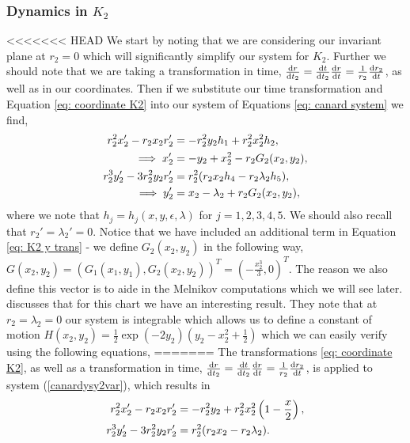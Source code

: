 \subsubsection{Dynamics in \texorpdfstring{$K_2$}{K2}}
<<<<<<< HEAD
We start by noting that we are considering our invariant plane at $r_2=0$ which will significantly simplify our system for $K_2$. Further we should note that we are taking a transformation in time, $\od{r}{t_2}=\od{t}{t_2}\od{r}{t}=\frac{1}{r_2}\od{r_2}{t}$, as well as in our coordinates. Then if we substitute our time transformation and Equation  \ref{eq: coordinate K2} into our system of Equations \ref{eq: canard system} we find, 
\begin{subequations}
	\begin{align}
	r_2^2x_2' - r_2x_2r_2'&=-r_2^2y_2h_1+r^2_2x^2_2h_2,\notag\\
	\implies x'_2&=-y_2+x_2^2-r_2G_2(x_2,y_2),\\
	r^3_2y_2'-3r_2^2y_2r_2'&=r^2_2(r_2x_2h_4-r_2\lambda_2h_5),\notag\\
	\implies y_2'&=x_2-\lambda_2+r_2G_2(x_2,y_2), \label{eq: K2 y trans}
	\end{align}
	\label{eq: reduced canard k2}
\end{subequations}
where we note that $h_j=h_j(x,y,\epsilon,\lambda)$ for $j=1,2,3,4,5$. We should also recall that $r_2'=\lambda_2'=0$. Notice that we have included an additional term in Equation \ref{eq: K2 y trans} - we define $G_2(x_2,y_2)$ in the following way, $G(x_2,y_2)=(G_1(x_1,y_1),G_2(x_2,y_2))^T=(-\frac{x^3_2}{3},0)^T$. The reason we also define this vector is to aide in the Melnikov computations which we will see later. \citet{krupa2001} discusses that for this chart we have an interesting result. They note that at $r_2=\lambda_2=0$ our system is integrable which allows us to define a constant of motion $H(x_2,y_2)=\frac{1}{2}\exp{(-2y_2)}\left(y_2-x^2_2+\frac{1}{2}\right)$ which we can easily verify \citep{krupa2001} using the following equations,
=======
The transformations \ref{eq: coordinate K2}, as well as a transformation in time, $\od{r}{t_2}=\od{t}{t_2}\od{r}{t}=\frac{1}{r_2}\od{r_2}{t}$, is applied to system (\ref{canardysy2var}), which results in 
\begin{align*}
	r_2^2x_2' - r_2x_2r_2'&=-r_2^2y_2+r^2_2x^2_2\left( 1 - \frac{x}{2} \right),\notag\\
	r^3_2y_2'-3r_2^2y_2r_2'&=r^2_2(r_2x_2-r_2\lambda_2).\notag\\
\end{align*}
